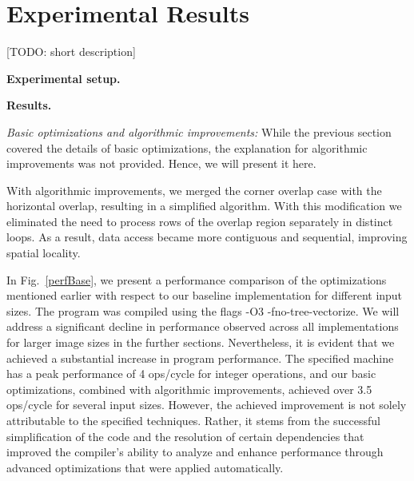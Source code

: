 \documentclass[letterpaper]{article}
\newcommand{\mypar}[1]{{\bf #1.}}
\newcommand{\inline}[1]{{\ttfamily\hyphenchar\font=45 #1}}
\begin{document}
\section{Experimental Results}\label{sec:exp}

[TODO: short description]

\mypar{Experimental setup} 

\mypar{Results}

\textit{Basic optimizations and algorithmic improvements:} While the previous section covered the details of basic optimizations, the explanation for algorithmic improvements was not provided. Hence, we will present it here.

With algorithmic improvements, we merged the corner overlap case with the horizontal overlap, resulting in a simplified algorithm. With this modification we eliminated the need to process rows of the overlap region separately in distinct loops. As a result, data access became more contiguous and sequential, improving spatial locality.

In Fig.~\ref{perfBase}, we present a performance comparison of the optimizations mentioned earlier with respect to our baseline implementation for different input sizes. The program was compiled using the flags \inline{-O3 -fno-tree-vectorize}. We will address a significant decline in performance observed across all implementations for larger image sizes in the further sections. Nevertheless, it is evident that we achieved a substantial increase in program performance. The specified machine has a peak performance of 4 ops/cycle for integer operations, and our basic optimizations, combined with algorithmic improvements, achieved over 3.5 ops/cycle for several input sizes. However, the achieved improvement is not solely attributable to the specified techniques. Rather, it stems from the successful simplification of the code and the resolution of certain dependencies that improved the compiler's ability to analyze and enhance performance through advanced optimizations that were applied automatically. 
\end{document}
